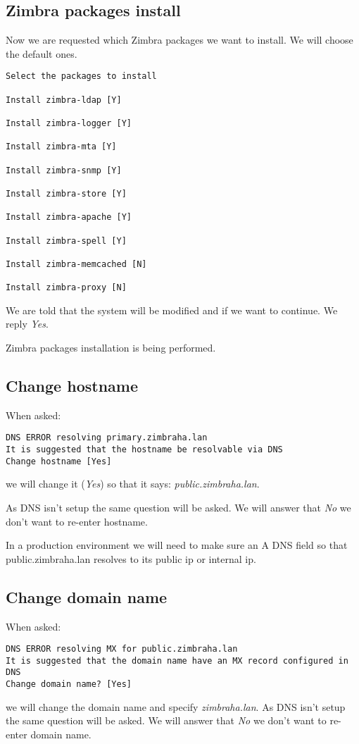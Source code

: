 \subsection {\label{subsec:zimbra-packages-install}Zimbra packages install}
Now we are requested which Zimbra packages we want to install. We will choose the default ones.

\begin{verbatim}
Select the packages to install

Install zimbra-ldap [Y] 

Install zimbra-logger [Y] 

Install zimbra-mta [Y] 

Install zimbra-snmp [Y] 

Install zimbra-store [Y] 

Install zimbra-apache [Y] 

Install zimbra-spell [Y] 

Install zimbra-memcached [N] 

Install zimbra-proxy [N] 
\end{verbatim}

We are told that the system will be modified and if we want to continue. We reply \textit{Yes}.

Zimbra packages installation is being performed.

\subsection {Change hostname}
When asked:
\begin{verbatim}
DNS ERROR resolving primary.zimbraha.lan
It is suggested that the hostname be resolvable via DNS
Change hostname [Yes]
\end{verbatim}
we will change it (\textit{Yes}) so that it says: \textit{public.zimbraha.lan}.

As DNS isn't setup the same question will be asked. We will answer that \textit{No} we don't want to re-enter hostname.

In a production environment we will need to make sure an A DNS field so that public.zimbraha.lan resolves to its public ip or internal ip.

\subsection {Change domain name}
When asked:
\begin{verbatim}
DNS ERROR resolving MX for public.zimbraha.lan
It is suggested that the domain name have an MX record configured in DNS
Change domain name? [Yes] 
\end{verbatim}
we will change the domain name and specify \textit{zimbraha.lan}. As DNS isn't setup the same question will be asked. We will answer that \textit{No} we don't want to re-enter domain name.

